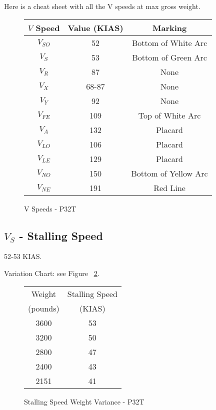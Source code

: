 Here is a cheat sheet with all the V speeds at max gross weight.

\begin{figure}
\begin{center}
\begin{tabular}{ |c|c|c| }
    \hline
    $V$ Speed & Value (KIAS) & Marking\\
    \hline
    \hline
     $V_{SO}$ &  52 & Bottom of White Arc \\
     $V_S$    &  53 & Bottom of Green Arc \\
    \hline
     $V_R$    &  87 & None \\
    \hline
     $V_X$    &  68-87 & None \\
     $V_Y$    &  92    & None \\
    \hline
     $V_{FE}$ &  109 & Top of White Arc \\
     $V_A$    &  132 & Placard \\
    \hline
     $V_{LO}$ &  106 & Placard \\
     $V_{LE}$ &  129 & Placard \\
    \hline
     $V_{NO}$ &  150 & Bottom of Yellow Arc \\
     $V_{NE}$ &  191 & Red Line \\
    \hline
\end{tabular}
\end{center}
\caption{V Speeds - P32T}
\label{fig:VSpeedsP32T}
\end{figure}

\subsection{$V_{S}$ - Stalling Speed}

52-53 KIAS.

Variation Chart: see Figure ~\ref{fig:StallSpeedsP32T}.

\begin{figure}
\begin{center}
\begin{tabular}{ |c|c| }
    \hline
    Weight & Stalling Speed \\
    (pounds) & (KIAS) \\
    \hline
     3600 &  53 \\
     3200 &  50 \\
    \hline
     2800 &  47 \\
     2400 &  43 \\
    \hline
     2151 &  41 \\
    \hline
\end{tabular}
\end{center}
\caption{Stalling Speed Weight Variance - P32T}
\label{fig:StallSpeedsP32T}
\end{figure}


